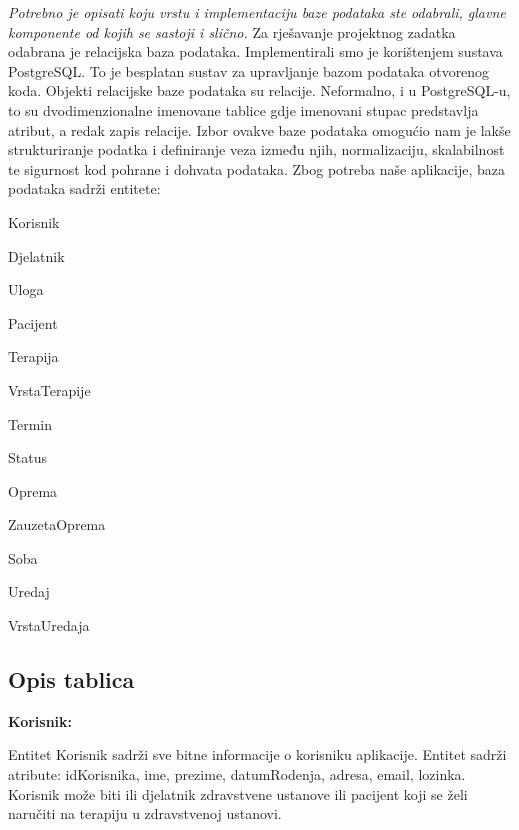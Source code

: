 		\textit{Potrebno je opisati koju vrstu i implementaciju baze podataka ste odabrali, glavne komponente od kojih se sastoji i slično.}
\textnormal{Za rješavanje projektnog zadatka odabrana je relacijska baza podataka. Implementirali smo je korištenjem sustava PostgreSQL. To je besplatan sustav za upravljanje bazom podataka otvorenog koda. Objekti relacijske baze podataka su relacije. Neformalno, i u PostgreSQL-u, to su dvodimenzionalne imenovane tablice gdje imenovani stupac predstavlja atribut, a redak zapis relacije. Izbor ovakve baze podataka omogućio nam je lakše strukturiranje podatka i definiranje veza između njih, normalizaciju, skalabilnost te sigurnost kod pohrane i dohvata podataka. 
Zbog potreba naše aplikacije, baza podataka sadrži entitete:}
             \begin{packed_item}
		\item 	\textnormal{Korisnik}
		\item 	\textnormal{Djelatnik}
		\item 	\textnormal{Uloga}
                   \item 	\textnormal{Pacijent}
                   \item 	\textnormal{Terapija}
                   \item 	\textnormal{VrstaTerapije}	
                   \item 	\textnormal{Termin}			
                   \item 	\textnormal{Status}	
                   \item 	\textnormal{Oprema}
                   \item 	\textnormal{ZauzetaOprema}	
                   \item 	\textnormal{Soba}	
                   \item 	\textnormal{Uredaj}
                   \item 	\textnormal{VrstaUredaja}
                   				
	 \end{packed_item}

		
			\subsection{Opis tablica}
			
 \textbf{Korisnik:}

 \textnormal{Entitet Korisnik sadrži sve bitne informacije o korisniku aplikacije. Entitet sadrži atribute: idKorisnika, ime, prezime, datumRodenja, adresa, email, lozinka. Korisnik može biti ili djelatnik zdravstvene ustanove ili pacijent koji se želi naručiti na terapiju u zdravstvenoj ustanovi.}

